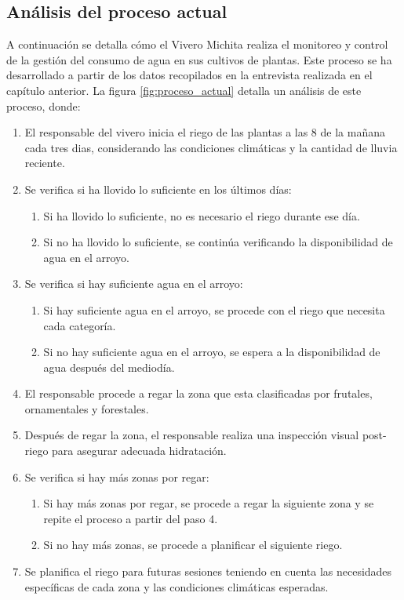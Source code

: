 \subsection{Análisis del proceso actual}

A continuación se detalla cómo el Vivero Michita realiza el monitoreo y control de la gestión del consumo de agua en sus cultivos de plantas. Este proceso se ha desarrollado a partir de los datos recopilados en la entrevista realizada en el capítulo anterior. La figura \ref{fig:proceso_actual} detalla un análisis de este proceso, donde:

\begin{enumerate}
    \item El responsable del vivero inicia el riego de las plantas a las 8 de la mañana cada tres dias, considerando las condiciones climáticas y la cantidad de lluvia reciente.
    \item Se verifica si ha llovido lo suficiente en los últimos días:
          \begin{enumerate}[label=(\alph*)]
              \item Si ha llovido lo suficiente, no es necesario el riego durante ese día.
              \item Si no ha llovido lo suficiente, se continúa verificando la disponibilidad de agua en el arroyo.
          \end{enumerate}
    \item Se verifica si hay suficiente agua en el arroyo:
          \begin{enumerate}[label=(\alph*)]
              \item Si hay suficiente agua en el arroyo, se procede con el riego que necesita cada categoría.
              \item Si no hay suficiente agua en el arroyo, se espera a la disponibilidad de agua después del mediodía.
          \end{enumerate}
    \item El responsable procede a regar la zona que esta clasificadas por frutales, ornamentales y forestales.
    \item Después de regar la zona, el responsable realiza una inspección visual post-riego para asegurar adecuada hidratación.
    \item Se verifica si hay más zonas por regar:
          \begin{enumerate}[label=(\alph*)]
              \item Si hay más zonas por regar, se procede a regar la siguiente zona y se repite el proceso a partir del paso 4.
              \item Si no hay más zonas, se procede a planificar el siguiente riego.
          \end{enumerate}
    \item Se planifica el riego para futuras sesiones teniendo en cuenta las necesidades específicas de cada zona y las condiciones climáticas esperadas.
\end{enumerate}

